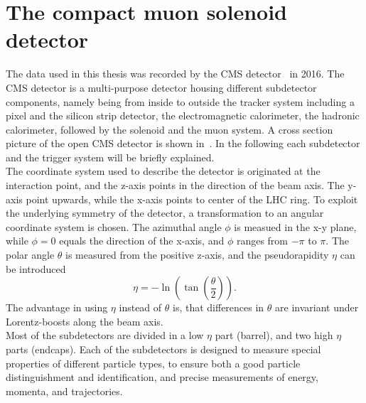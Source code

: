 \section{The compact muon solenoid detector}\label{sec:CMS}
The data used in this thesis was recorded by the CMS detector~\cite{CMS,CMSTDR} in 2016. The CMS detector is a multi-purpose detector housing different subdetector components, namely being from inside to outside the tracker system including a pixel and the silicon strip detector, the electromagnetic calorimeter, the hadronic calorimeter, followed by the solenoid and the muon system. A cross section picture of the open CMS detector is shown in~. In the following each subdetector and the trigger system will be briefly explained.\\
The coordinate system used to describe the detector is originated at the interaction point, and the z-axis points in the direction of the beam axis. The y-axis point upwards, while the x-axis points to center of the LHC ring. To exploit the underlying symmetry of the detector, a transformation to an angular coordinate system is chosen. The azimuthal angle $\phi$ is measued in the x-y plane, while $\phi=0$ equals the direction of the x-axis, and $\phi$ ranges from $-\pi$ to $\pi$. The polar angle $\theta$ is measured from the positive z-axis, and the pseudorapidity $\eta$ can be introduced
\begin{equation}
 \eta=-\ln\left(\tan\left(\frac{\theta}{2}\right)\right).
\end{equation}
The advantage in using $\eta$ instead of $\theta$ is, that differences in $\theta$ are invariant under Lorentz-boosts along the beam axis.\\
Most of the subdetectors are divided in a low $\eta$ part (barrel), and two high $\eta$ parts (endcaps). Each of the subdetectors is designed to measure special properties of different particle types, to ensure both a good particle distinguishment and identification, and precise measurements of energy, momenta, and trajectories.

